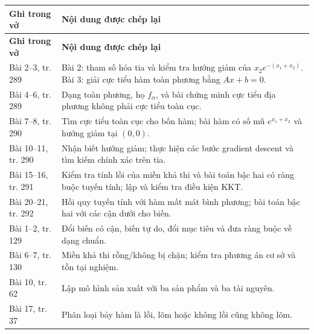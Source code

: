 \documentclass[11pt,a4paper]{article}
\begin{document}
\begin{longtable}{p{}p{}}
\toprule
\textbf{Ghi trong vở} & \textbf{Nội dung được chép lại}\\
\midrule
\endfirsthead
\toprule
\textbf{Ghi trong vở} & \textbf{Nội dung được chép lại}\\
\midrule
\endhead
Bài 2--3, tr. 289 &
Bài 2: tham số hóa tia và kiểm tra hướng giảm của \(x_2e^{-(x_1+x_2)}\). Bài 3: giải cực tiểu hàm toàn phương bằng \(Ax+b=0\).\\
Bài 4--6, tr. 289 &
Dạng toàn phương, họ \(f_\alpha\), và bài chứng minh cực tiểu địa phương không phải cực tiểu toàn cục.\\
Bài 7--8, tr. 290 &
Tìm cực tiểu toàn cục cho bốn hàm; bài hàm có số mũ \(e^{x_1+x_2}\) và hướng giảm tại \((0,0)\).\\
Bài 10--11, tr. 290 &
Nhận biết hướng giảm; thực hiện các bước gradient descent và tìm kiếm chính xác trên tia.\\
Bài 15--16, tr. 291 &
Kiểm tra tính lồi của miền khả thi và bài toán bậc hai có ràng buộc tuyến tính; lập và kiểm tra điều kiện KKT.\\
Bài 20--21, tr. 292 &
Hồi quy tuyến tính với hàm mất mát bình phương; bài toán bậc hai với các cận dưới cho biến.\\
Bài 1--2, tr. 129 &
Đổi biến có cận, biến tự do, đổi mục tiêu và đưa ràng buộc về dạng chuẩn.\\
Bài 6--7, tr. 130 &
Miền khả thi rỗng/không bị chặn; kiểm tra phương án cơ sở và tồn tại nghiệm.\\
Bài 10, tr. 62 &
Lập mô hình sản xuất với ba sản phẩm và ba tài nguyên.\\
Bài 17, tr. 37 &
Phân loại bảy hàm là lồi, lõm hoặc không lồi cũng không lõm.\\
\bottomrule
\end{longtable}
\end{document}
